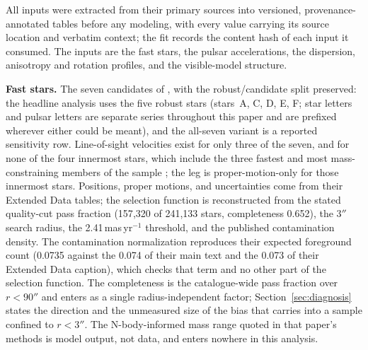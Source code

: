 \documentclass[11pt]{article}
\begin{document}
All inputs were extracted from their primary sources into versioned, provenance-annotated tables before any modeling, with every value carrying its source location and verbatim context; the fit records the content hash of each input it consumed. The inputs are the fast stars, the pulsar accelerations, the dispersion, anisotropy and rotation profiles, and the visible-model structure.

\textbf{Fast stars.} The seven candidates of \citet{Haberle2024Nature}, with the robust/candidate split preserved: the headline analysis uses the five robust stars (stars~A, C, D, E, F; star letters and pulsar letters are separate series throughout this paper and are prefixed wherever either could be meant), and the all-seven variant is a reported sensitivity row. Line-of-sight velocities exist for only three of the seven, and for none of the four innermost stars, which include the three fastest and most mass-constraining members of the sample \citep{Haberle2025Thesis}; the leg is proper-motion-only for those innermost stars. Positions, proper motions, and uncertainties come from their Extended Data tables; the selection function is reconstructed from the stated quality-cut pass fraction (157{,}320 of 241{,}133 stars, completeness 0.652), the $3''$ search radius, the 2.41\,mas\,yr$^{-1}$ threshold, and the published contamination density. The contamination normalization reproduces their expected foreground count (0.0735 against the 0.074 of their main text and the 0.073 of their Extended Data caption), which checks that term and no other part of the selection function. The completeness is the catalogue-wide pass fraction over $r < 90''$ and enters as a single radius-independent factor; Section~\ref{sec:diagnosis} states the direction and the unmeasured size of the bias that carries into a sample confined to $r < 3''$. The N-body-informed mass range quoted in that paper's methods is model output, not data, and enters nowhere in this analysis.
\end{document}
